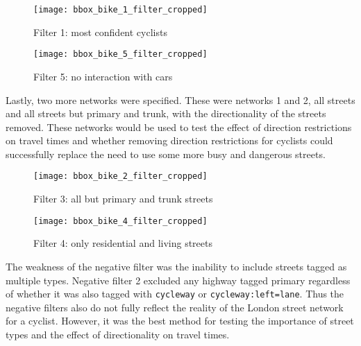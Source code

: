 \begin{figure}
  \centering
  \texttt{[image: bbox\_bike\_1\_filter\_cropped]}
  \caption{Filter 1: most confident cyclists}
  \label{fig:sub1}
\end{figure}

\begin{figure}
  \centering
  \texttt{[image: bbox\_bike\_5\_filter\_cropped]}
  \caption{Filter 5: no interaction with cars }
  \label{fig:sub2}
\end{figure}

Lastly, two more networks were specified. These were networks 1 and 2, all streets and all streets but primary and trunk, with the directionality of the streets removed. These networks would be used to test the effect of direction restrictions on travel times and whether removing direction restrictions for cyclists could successfully replace the need to use some more busy and dangerous streets. 

\begin{figure}
  \centering
  \texttt{[image: bbox\_bike\_2\_filter\_cropped]}
  \caption{Filter 3: all but primary and trunk streets}
  \label{fig:sub3}
\end{figure}



\begin{figure}
  \centering
  \texttt{[image: bbox\_bike\_4\_filter\_cropped]}
  \caption{Filter 4: only residential and living streets}
  \label{fig:sub4}
\end{figure}

The weakness of the negative filter was the inability to include streets tagged as multiple types. Negative filter 2 excluded any highway tagged primary regardless of whether it was also tagged with \texttt{cycleway} or \texttt{cycleway:left=lane}. Thus the negative filters also do not fully reflect the reality of the London street network for a cyclist. However, it was the best method for testing the importance of street types and the effect of directionality on travel times. 

%

